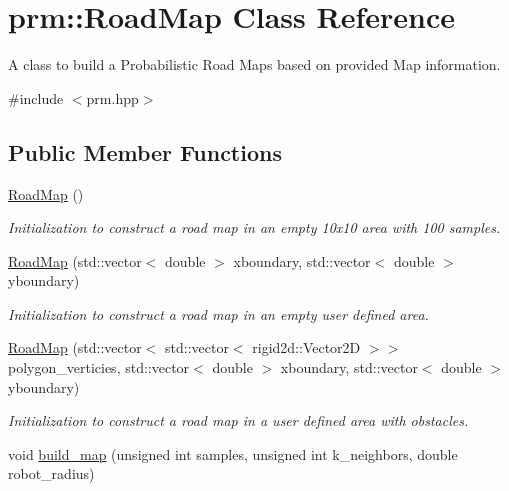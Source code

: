 \hypertarget{classprm_1_1RoadMap}{}\section{prm\+:\+:Road\+Map Class Reference}
\label{classprm_1_1RoadMap}


A class to build a Probabilistic Road Maps based on provided Map information.  




{\ttfamily \#include $<$prm.\+hpp$>$}

\subsection*{Public Member Functions}
\begin{DoxyCompactItemize}
\item 
\mbox{\label{classprm_1_1RoadMap_a877e89a3bd0b0df936181c94aaeacb59}} 
\hyperlink{classprm_1_1RoadMap_a877e89a3bd0b0df936181c94aaeacb59}{Road\+Map} ()
\begin{DoxyCompactList}\small\item\em Initialization to construct a road map in an empty 10x10 area with 100 samples. \end{DoxyCompactList}\item 
\hyperlink{classprm_1_1RoadMap_a95a183725f0ee0f2b0ce2643aa1ed870}{Road\+Map} (std\+::vector$<$ double $>$ xboundary, std\+::vector$<$ double $>$ yboundary)
\begin{DoxyCompactList}\small\item\em Initialization to construct a road map in an empty user defined area. \end{DoxyCompactList}\item 
\hyperlink{classprm_1_1RoadMap_a1c44e6fa58b91b3b79bcf56e414dff44}{Road\+Map} (std\+::vector$<$ std\+::vector$<$ rigid2d\+::\+Vector2D $>$$>$ polygon\+\_\+verticies, std\+::vector$<$ double $>$ xboundary, std\+::vector$<$ double $>$ yboundary)
\begin{DoxyCompactList}\small\item\em Initialization to construct a road map in a user defined area with obstacles. \end{DoxyCompactList}\item 
void \hyperlink{classprm_1_1RoadMap_ab81f9c73d7539b570a2164369144c41f}{build\+\_\+map} (unsigned int samples, unsigned int k\+\_\+neighbors, double robot\+\_\+radius)
$$
\end{DoxyCompactItemize}
